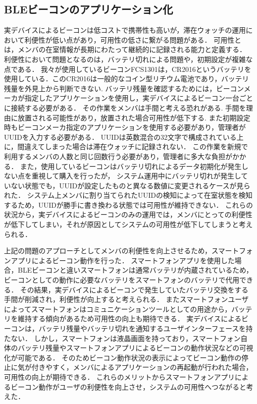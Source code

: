 \subsection{ BLEビーコンのアプリケーション化}
実デバイスによるビーコンは低コストで携帯性も高いが，滞在ウォッチの運用において利便性が低い点があり，可用性の低さに繋がる問題がある．
可用性とは，メンバの在室情報が長期にわたって継続的に記録される能力と定義する．  
利便性において問題となるのは，バッテリ切れによる問題や，初期設定が複雑な点である．
我々が使用しているビーコンFCS1301は，CR2016というバッテリを使用している．このCR2016は一般的なコイン型リチウム電池であり，バッテリ残量を外見上から判断できない.
バッテリ残量を確認するためには，ビーコンメーカが指定したアプリケーションを使用し，実デバイスによるビーコン一台ごとに接続する必要がある．
その作業をメンバは手間と考える恐れがある.
手間を理由に放置される可能性があり，放置された場合可用性が低下する.
また初期設定時もビーコンメーカ指定のアプリケーションを使用する必要があり，管理者がUUIDを入力する必要がある．
UUIDは英数混合の32文字で構成されている上に，間違えてしまった場合は滞在ウォッチに記録されない．
この作業を新規で利用するメンバの人数と同じ回数行う必要があり，管理者に多大な負担がかかる．
また，使用しているビーコンはバッテリ切れによるデータ初期化が発生しない点を重視して購入を行ったが，
システム運用中にバッテリ切れが発生していない状態でも，UUIDが設定したものと異なる数値に変更されるケースが見られた．
システム上メンバに割り当てられたUUIDの検知によって在室状態を検知するため，UUIDが勝手に書き換わる状態では可用性が維持できない．
これらの状況から，実デバイスによるビーコンのみの運用では，メンバにとっての利便性が低下してしまい，それが原因としてシステムの可用性が低下してしまうと考えられる．

上記の問題のアプローチとしてメンバの利便性を向上させるため，スマートフォンアプリによるビーコン動作を行った．
スマートフォンアプリを使用した場合，BLEビーコンと違いスマートフォンは通常バッテリが内蔵されているため，ビーコンとしての動作に必要なバッテリをスマートフォンのバッテリで代用できる．
その結果，実デバイスによるビーコンで発生していたバッテリ交換をする手間が削減され，利便性が向上すると考えられる．
またスマートフォンユーザによってスマートフォンはコミュニケーションツールとしての用途から，バッテリを維持する傾向があるため可用性の向上も期待できる．
実デバイスによるビーコンは，バッテリ残量やバッテリ切れを通知するユーザインターフェースを持たない．
しかし，スマートフォンは液晶画面を持っており，スマートフォン自体のバッテリ残量やスマートフォンアプリによるビーコンの動作状況などの可視化が可能である．
そのためビーコン動作状況の表示によってビーコン動作の停止に気が付きやすく，メンバによるアプリケーションの再起動が行われた場合，可用性の向上が期待できる．
これらのメリットからスマートフォンアプリによるビーコン動作がユーザの利便性を向上させ，システムの可用性へつながると考えた．


